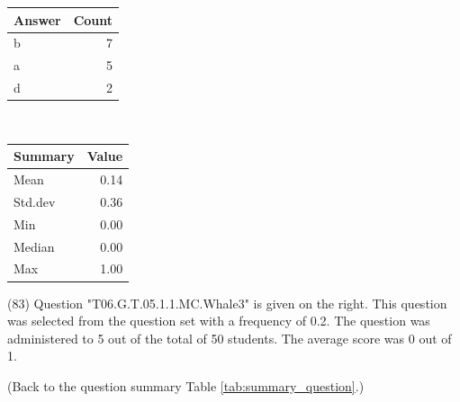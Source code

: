 \documentclass[12pt,english,nohyper]{tufte-handout}\usepackage[]{graphicx}\usepackage[]{color}
\begin{document}
\begin{center}%
\begin{tabular}{lr}
  \hline
Answer & Count \\ 
  \hline
b &   7 \\ 
  a &   5 \\ 
  d &   2 \\ 
   \hline
\end{tabular}
~~~~~~~~%
\begin{tabular}{lr}
  \hline
Summary & Value \\ 
  \hline
Mean & 0.14 \\ 
  Std.dev & 0.36 \\ 
  Min & 0.00 \\ 
  Median & 0.00 \\ 
  Max & 1.00 \\ 
   \hline
\end{tabular}
\end{center}\newpage{} (83) Question "T06.G.T.05.1.1.MC.Whale3" is given on the right. This question was selected from the question set with a frequency of 0.2. The question was administered to 5 out of the total of 50 students. The average score was 0 out of 1.

 (Back to the question summary Table \ref{tab:summary_question}.)
\end{document}
